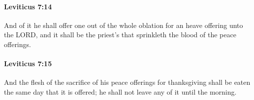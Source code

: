 		\paragraph{Leviticus 7:14} %
			\label{LEVITICUS-7-14}

			And of it he shall offer one out of the whole oblation for an heave offering unto the LORD, and it shall be the priest’s that sprinkleth the blood of the peace offerings.


		\paragraph{Leviticus 7:15} %
			\label{LEVITICUS-7-15}

			And the flesh of the sacrifice of his peace offerings for thanksgiving shall be eaten the same day that it is offered; he shall not leave any of it until the morning.


